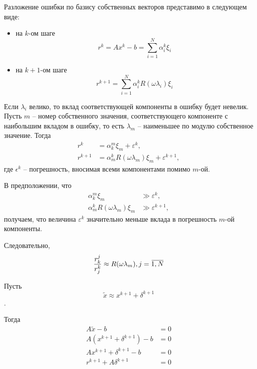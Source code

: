 \documentclass[a4paper,14pt]{extreport}
\begin{document}
Разложение ошибки по базису собственных векторов представимо в следующем виде: 
	\begin{itemize}
	  \item на $k$-ом шаге\hfill
	  	\begin{equation}\label{komp:nev1}
	  	 r^k=Ax^k - b=\sum_{i=1}^{N}\alpha_i^k\xi_i
	  	 \end{equation}
	  \item на $k+1$-ом шаге\hfill
	  	\begin{equation}\label{komp:nev2}
	  	r^{k+1}=\sum_{i=1}^{N}\alpha_i^kR(\omega\lambda_i)\xi_i
	  	\end{equation}
	\end{itemize}
	
Если $\lambda_i$ велико, то вклад соответствующей компоненты в ошибку будет невелик. Пусть $m$ -- номер собственного значения, соответствующего компоненте с наибольшим вкладом в ошибку, то есть $\lambda_m$ -- наименьшее по модулю собственное значение. Тогда
	\begin{equation}
	\label{komp:nev3}	
	\begin{aligned}
		r^k&=\alpha_k^m\xi_m + \varepsilon^k,\\
	    r^{k+1}&=\alpha_m^kR(\omega\lambda_m)\xi_m + \varepsilon^{k+1},
	 \end{aligned}
	\end{equation}
где $\epsilon^k$ -- погрешность, вносимая всеми компонентами помимо $m$-ой.

В предположении, что 
	\begin{equation}
	\label{komp:error1}	
	\begin{aligned}
		\alpha_k^m\xi_m &\gg \varepsilon^k,\\
	    \alpha_m^kR(\omega\lambda_m)\xi_m &\gg \varepsilon^{k+1},
	 \end{aligned}
	\end{equation}
получаем, что величина $\varepsilon^k$ значительно меньше вклада в погрешность $m$-ой компоненты. 

Следовательно,
	\begin{equation}
	\label{komp:nev_ratio}	
		\frac{r_k^j}{r_j^k} \approx R(\omega \lambda_m), j=\overbar{1, N}\\
	\end{equation}

Пусть $$\widetilde{x} \approx x^{k+1} + \delta^{k+1}$$.

Тогда 	
	\begin{equation}
	\label{komp:many_eq1}	
		\begin{aligned}
		A\widetilde{x} - b &= 0 \\
		A(x^{k+1} + \delta^{k+1}) - b &= 0 \\
		Ax^{k+1} + \delta^{k+1} - b &= 0 \\
		r^{k+1} + A\delta^{k+1} &= 0
		\end{aligned}
	\end{equation}
\end{document}
